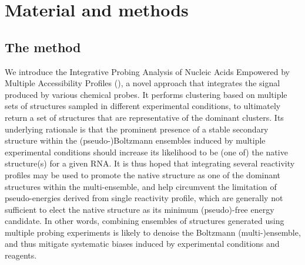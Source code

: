 \documentclass[a4,center,fleqn]{NAR}
\begin{document}
\section*{Material and methods}

\subsection*{The \OurTool{} method}
 
We introduce the Integrative Probing Analysis of Nucleic Acids Empowered by Multiple Accessibility Profiles (\OurTool{}), a novel approach that integrates the signal produced by various chemical probes. It performs clustering based on multiple sets of structures sampled in different experimental conditions, to ultimately return a set of structures that are representative of the dominant clusters. Its underlying rationale is that the prominent presence of a stable secondary structure within the  (pseudo-)Boltzmann ensembles induced by multiple experimental conditions should increase its likelihood to be (one of) the native structure(s) for a given RNA. It is thus hoped that integrating several reactivity profiles may be used to promote the native structure as one of the dominant structures within the multi-ensemble, and help circumvent the limitation of pseudo-energies derived from single reactivity profile, which are generally not sufficient to elect the native structure as its minimum (pseudo)-free energy candidate. In other words, combining ensembles of structures generated using multiple probing experiments is likely to denoise the Boltzmann (multi-)ensemble, and thus mitigate systematic biases induced by experimental conditions and reagents.
\end{document}
